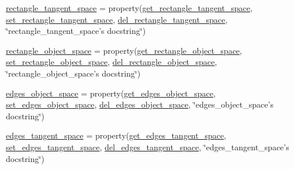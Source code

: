 \begin{DoxyCompactItemize}
\hyperlink{classdestruction_1_1_bounding_box_1_1_bounding_box2_d_a389f3819e70ac8d28b6d52fbe84b8a2f}{rectangle\-\_\-tangent\-\_\-space} = property(\hyperlink{classdestruction_1_1_bounding_box_1_1_bounding_box2_d_a17e13822cd3fde55b4de970a08bc504e}{get\-\_\-rectangle\-\_\-tangent\-\_\-space}, \hyperlink{classdestruction_1_1_bounding_box_1_1_bounding_box2_d_a48082fe429a632d5f07482c4ec0b66bf}{set\-\_\-rectangle\-\_\-tangent\-\_\-space}, \hyperlink{classdestruction_1_1_bounding_box_1_1_bounding_box2_d_acd149a438a3818db6abf682c00005d2f}{del\-\_\-rectangle\-\_\-tangent\-\_\-space}, \char`\"{}rectangle\-\_\-tangent\-\_\-space's docstring\char`\"{})
\item 
\hyperlink{classdestruction_1_1_bounding_box_1_1_bounding_box2_d_ad84d26b6adab2ff4c5759613b26c909c}{rectangle\-\_\-object\-\_\-space} = property(\hyperlink{classdestruction_1_1_bounding_box_1_1_bounding_box2_d_ab5192b4f8bc7f2166e5607804294cac6}{get\-\_\-rectangle\-\_\-object\-\_\-space}, \hyperlink{classdestruction_1_1_bounding_box_1_1_bounding_box2_d_aa39cef3406e6b34a5356190ce94cdf76}{set\-\_\-rectangle\-\_\-object\-\_\-space}, \hyperlink{classdestruction_1_1_bounding_box_1_1_bounding_box2_d_aa0cbf18b5aa8e99741fcebc96549baaf}{del\-\_\-rectangle\-\_\-object\-\_\-space}, \char`\"{}rectangle\-\_\-object\-\_\-space's docstring\char`\"{})
\item 
\hyperlink{classdestruction_1_1_bounding_box_1_1_bounding_box2_d_a7419ebda7a180604694364051edadd4e}{edges\-\_\-object\-\_\-space} = property(\hyperlink{classdestruction_1_1_bounding_box_1_1_bounding_box2_d_ab96328ba2ea0c6dd638a725186f4b413}{get\-\_\-edges\-\_\-object\-\_\-space}, \hyperlink{classdestruction_1_1_bounding_box_1_1_bounding_box2_d_a74ee3e291c5ab33fa6de38d34d1dfb0f}{set\-\_\-edges\-\_\-object\-\_\-space}, \hyperlink{classdestruction_1_1_bounding_box_1_1_bounding_box2_d_ab9c417c5505fc4d87d6ffeebf5ec7cf1}{del\-\_\-edges\-\_\-object\-\_\-space}, \char`\"{}edges\-\_\-object\-\_\-space's docstring\char`\"{})
\item 
\hyperlink{classdestruction_1_1_bounding_box_1_1_bounding_box2_d_a854b3e69416c0ee9b1a66e8f0c0c4c6c}{edges\-\_\-tangent\-\_\-space} = property(\hyperlink{classdestruction_1_1_bounding_box_1_1_bounding_box2_d_a3f1db2c8652ad767b2615556233e29ec}{get\-\_\-edges\-\_\-tangent\-\_\-space}, \hyperlink{classdestruction_1_1_bounding_box_1_1_bounding_box2_d_a66a0354305b2afc0fcd889011138691a}{set\-\_\-edges\-\_\-tangent\-\_\-space}, \hyperlink{classdestruction_1_1_bounding_box_1_1_bounding_box2_d_a5341ea9afdac2a28d083aa151b2b1c37}{del\-\_\-edges\-\_\-tangent\-\_\-space}, \char`\"{}edges\-\_\-tangent\-\_\-space's docstring\char`\"{})

\end{DoxyCompactItemize}

